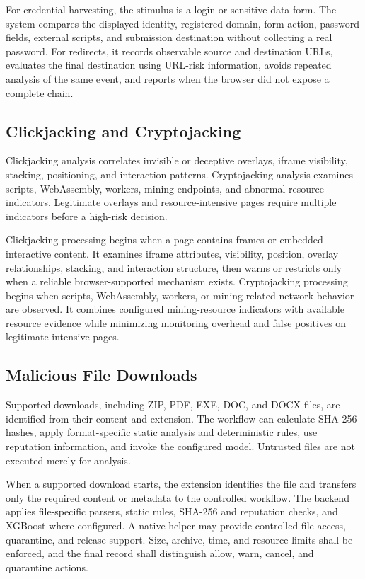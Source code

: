 For credential harvesting, the stimulus is a login or sensitive-data form. The
system compares the displayed identity, registered domain, form action, password
fields, external scripts, and submission destination without collecting a real
password. For redirects, it records observable source and destination URLs,
evaluates the final destination using URL-risk information, avoids repeated
analysis of the same event, and reports when the browser did not expose a complete
chain.

\subsection{Clickjacking and Cryptojacking}
Clickjacking analysis correlates invisible or deceptive overlays, iframe visibility,
stacking, positioning, and interaction patterns. Cryptojacking analysis examines
scripts, WebAssembly, workers, mining endpoints, and abnormal resource indicators.
Legitimate overlays and resource-intensive pages require multiple indicators before
a high-risk decision.

Clickjacking processing begins when a page contains frames or embedded interactive
content. It examines iframe attributes, visibility, position, overlay relationships,
stacking, and interaction structure, then warns or restricts only when a reliable
browser-supported mechanism exists. Cryptojacking processing begins when scripts,
WebAssembly, workers, or mining-related network behavior are observed. It combines
configured mining-resource indicators with available resource evidence while
minimizing monitoring overhead and false positives on legitimate intensive pages.

\subsection{Malicious File Downloads}
Supported downloads, including ZIP, PDF, EXE, DOC, and DOCX files, are identified
from their content and extension. The workflow can calculate SHA-256 hashes, apply
format-specific static analysis and deterministic rules, use reputation information,
and invoke the configured model. Untrusted files are not executed merely for
analysis.

When a supported download starts, the extension identifies the file and transfers
only the required content or metadata to the controlled workflow. The backend
applies file-specific parsers, static rules, SHA-256 and reputation checks, and
XGBoost where configured. A native helper may provide controlled file access,
quarantine, and release support. Size, archive, time, and resource limits shall
be enforced, and the final record shall distinguish allow, warn, cancel, and
quarantine actions.


